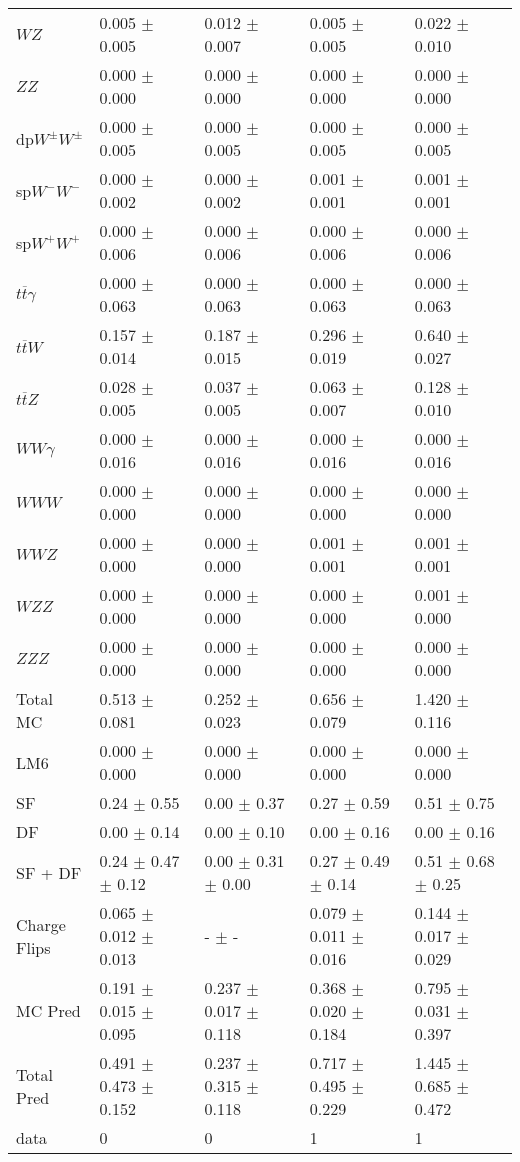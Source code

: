 \begin{tabular}{l | l l l l}
$WZ$ &  0.005 $\pm$  0.005 &  0.012 $\pm$  0.007 &  0.005 $\pm$  0.005 &  0.022 $\pm$  0.010\\
$ZZ$ &  0.000 $\pm$   0.000 &  0.000 $\pm$   0.000 &   0.000 $\pm$   0.000 &   0.000 $\pm$   0.000\\
\hline
dp$W^{\pm}W^{\pm}$ &  0.000 $\pm$  0.005 &  0.000 $\pm$  0.005 &  0.000 $\pm$  0.005 &  0.000 $\pm$  0.005\\
sp$W^{-}W^{-}$ &  0.000 $\pm$  0.002 &  0.000 $\pm$  0.002 &  0.001 $\pm$  0.001 &  0.001 $\pm$  0.001\\
sp$W^{+}W^{+}$ &  0.000 $\pm$  0.006 &  0.000 $\pm$  0.006 &  0.000 $\pm$  0.006 &  0.000 $\pm$  0.006\\
$t\overline{t}\gamma$ &  0.000 $\pm$  0.063 &  0.000 $\pm$  0.063 &  0.000 $\pm$  0.063 &  0.000 $\pm$  0.063\\
$t\overline{t}W$ &  0.157 $\pm$  0.014 &  0.187 $\pm$  0.015 &  0.296 $\pm$  0.019 &  0.640 $\pm$  0.027\\
$t\overline{t}Z$ &  0.028 $\pm$  0.005 &  0.037 $\pm$  0.005 &  0.063 $\pm$  0.007 &  0.128 $\pm$  0.010\\
$WW\gamma$ &  0.000 $\pm$  0.016 &  0.000 $\pm$  0.016 &  0.000 $\pm$  0.016 &  0.000 $\pm$  0.016\\
$WWW$ &  0.000 $\pm$   0.000 &   0.000 $\pm$   0.000 &   0.000 $\pm$   0.000 &   0.000 $\pm$   0.000\\
$WWZ$ &  0.000 $\pm$   0.000 &  0.000 $\pm$   0.000 &  0.001 $\pm$  0.001 &  0.001 $\pm$  0.001\\
$WZZ$ &   0.000 $\pm$   0.000 &   0.000 $\pm$   0.000 &  0.000 $\pm$   0.000 &  0.001 $\pm$   0.000\\
$ZZZ$ &   0.000 $\pm$   0.000 &  0.000 $\pm$   0.000 &   0.000 $\pm$   0.000 &   0.000 $\pm$   0.000\\
\hline
Total MC &  0.513 $\pm$  0.081 &  0.252 $\pm$  0.023 &  0.656 $\pm$  0.079 &  1.420 $\pm$  0.116\\
\hline\hline
\hline
LM6 &  0.000 $\pm$  0.000 &  0.000 $\pm$  0.000 &  0.000 $\pm$  0.000 &  0.000 $\pm$  0.000\\
\hline\hline
\hline\hline
 SF  & 0.24 $\pm$ 0.55 & 0.00 $\pm$ 0.37 & 0.27 $\pm$ 0.59 & 0.51 $\pm$ 0.75\\
 DF  & 0.00 $\pm$ 0.14 & 0.00 $\pm$ 0.10 & 0.00 $\pm$ 0.16 & 0.00 $\pm$ 0.16\\
\hline
 SF + DF  & 0.24 $\pm$ 0.47 $\pm$ 0.12 & 0.00 $\pm$ 0.31 $\pm$ 0.00 & 0.27 $\pm$ 0.49 $\pm$ 0.14 & 0.51 $\pm$ 0.68 $\pm$ 0.25\\
\hline\hline
Charge Flips & 0.065 $\pm$ 0.012 $\pm$ 0.013 & - $\pm$ - & 0.079 $\pm$ 0.011 $\pm$ 0.016 & 0.144 $\pm$ 0.017 $\pm$ 0.029\\
\hline\hline
\hline
MC Pred &  0.191 $\pm$  0.015 $\pm$  0.095 &  0.237 $\pm$  0.017 $\pm$  0.118 &  0.368 $\pm$  0.020 $\pm$  0.184 &  0.795 $\pm$  0.031 $\pm$  0.397\\
\hline\hline
Total Pred &  0.491 $\pm$  0.473 $\pm$  0.152 &  0.237 $\pm$  0.315 $\pm$  0.118 &  0.717 $\pm$  0.495 $\pm$  0.229 &  1.445 $\pm$  0.685 $\pm$  0.472\\
\hline\hline
data & 0 & 0 & 1 & 1\\
\hline\hline
\end{tabular}
